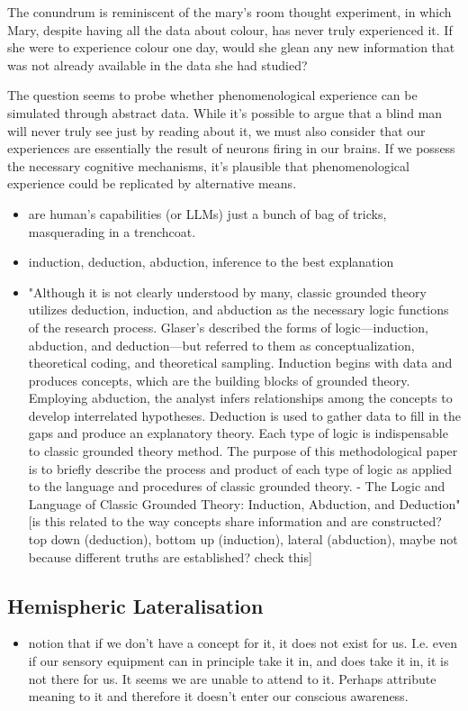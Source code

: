 The conundrum is reminiscent of the mary's room thought experiment, in which Mary, despite having all the data about colour, has never truly experienced it. If she were to experience colour one day, would she glean any new information that was not already available in the data she had studied?

The question seems to probe whether phenomenological experience can be simulated through abstract data. While it's possible to argue that a blind man will never truly see just by reading about it, we must also consider that our experiences are essentially the result of neurons firing in our brains. If we possess the necessary cognitive mechanisms, it's plausible that phenomenological experience could be replicated by alternative means.


\begin{itemize}
    \item are human's capabilities (or LLMs) just a bunch of bag of tricks, masquerading in a trenchcoat.
    \item induction, deduction, abduction, inference to the best explanation
    \item "Although it is not clearly understood by many, classic grounded theory utilizes deduction, induction, and abduction as the necessary logic functions of the research process. Glaser’s described the forms of logic—induction, abduction, and deduction—but referred to them as conceptualization, theoretical coding, and theoretical sampling. Induction begins with data and produces concepts, which are the building blocks of grounded theory. Employing abduction, the analyst infers relationships among the concepts to develop interrelated hypotheses. Deduction is used to gather data to fill in the gaps and produce an explanatory theory. Each type of logic is indispensable to classic grounded theory method. The purpose of this methodological paper is to briefly describe the process and product of each type of logic as applied to the language and procedures of classic grounded theory. - The Logic and Language of Classic Grounded Theory: Induction, Abduction, and Deduction" [is this related to the way concepts share information and are constructed? top down (deduction), bottom up (induction), lateral (abduction), maybe not because different truths are established? check this]
\end{itemize}


\subsection{Hemispheric Lateralisation}
\begin{itemize}
    \item notion that if we don't have a concept for it, it does not exist for us. I.e. even if our sensory equipment can in principle take it in, and does take it in, it is not there for us. It seems we are unable to attend to it. Perhaps attribute meaning to it and therefore it doesn't enter our conscious awareness.
\end{itemize}



